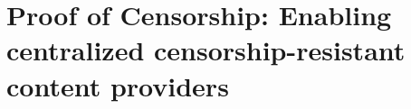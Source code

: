 


\newcommand{\imm}[1]{\textcolor{blue}{IMM:#1}}
\newcommand{\ewust}[1]{\textcolor{green}{ewust:#1}}
\newcommand{\tim}[1]{\textcolor{red}{TIM:#1}}

\chapter{Proof of Censorship: Enabling centralized censorship-resistant content providers}\label{ch:poc}






